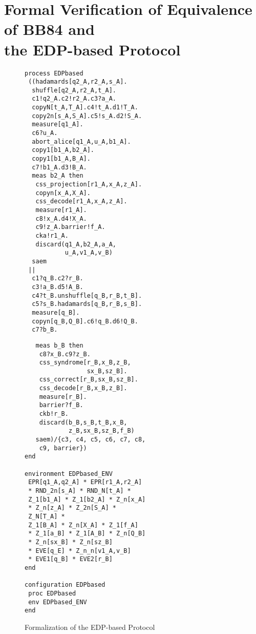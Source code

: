 \section{Formal Verification of Equivalence of BB84 and \\
the EDP-based Protocol}
\label{fml:formalverif1}
\begin{figure}
\begin{minipage}{0.5\hsize}
\begin{verbatim}
process EDPbased
 ((hadamards[q2_A,r2_A,s_A].
  shuffle[q2_A,r2_A,t_A].
  c1!q2_A.c2!r2_A.c3?a_A.
  copyN[t_A,T_A].c4!t_A.d1!T_A.
  copy2n[s_A,S_A].c5!s_A.d2!S_A.
  measure[q1_A].
  c6?u_A.
  abort_alice[q1_A,u_A,b1_A].
  copy1[b1_A,b2_A].
  copy1[b1_A,B_A].
  c7!b1_A.d3!B_A.
  meas b2_A then
   css_projection[r1_A,x_A,z_A].
   copyn[x_A,X_A].
   css_decode[r1_A,x_A,z_A].
   measure[r1_A].
   c8!x_A.d4!X_A.
   c9!z_A.barrier!f_A.
   cka!r1_A.
   discard(q1_A,b2_A,a_A,
           u_A,v1_A,v_B)
  saem
 ||
  c1?q_B.c2?r_B.
  c3!a_B.d5!A_B.
  c4?t_B.unshuffle[q_B,r_B,t_B].
  c5?s_B.hadamards[q_B,r_B,s_B].
  measure[q_B].
  copyn[q_B,Q_B].c6!q_B.d6!Q_B.
  c7?b_B.
\end{verbatim}
\end{minipage}
\begin{minipage}{0.5\hsize}
\begin{verbatim}
   meas b_B then 
    c8?x_B.c9?z_B.
    css_syndrome[r_B,x_B,z_B,
                 sx_B,sz_B].
    css_correct[r_B,sx_B,sz_B].
    css_decode[r_B,x_B,z_B].
    measure[r_B].
    barrier?f_B.
    ckb!r_B.
    discard(b_B,s_B,t_B,x_B,
            z_B,sx_B,sz_B,f_B)
   saem)/{c3, c4, c5, c6, c7, c8, 
    c9, barrier})
end

environment EDPbased_ENV
 EPR[q1_A,q2_A] * EPR[r1_A,r2_A]
 * RND_2n[s_A] * RND_N[t_A] *
 Z_1[b1_A] * Z_1[b2_A] * Z_n[x_A]
 * Z_n[z_A] * Z_2n[S_A] * 
 Z_N[T_A] * 
 Z_1[B_A] * Z_n[X_A] * Z_1[f_A]
 * Z_1[a_B] * Z_1[A_B] * Z_n[Q_B]
 * Z_n[sx_B] * Z_n[sz_B]
 * EVE[q_E] * Z_n_n[v1_A,v_B]
 * EVE1[q_B] * EVE2[r_B]
end

configuration EDPbased
 proc EDPbased
 env EDPbased_ENV
end
\end{verbatim}
\end{minipage}
\caption{Formalization of the EDP-based Protocol}
\label{fml:EDPbased}
\end{figure}

